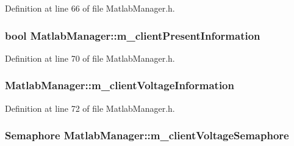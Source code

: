 Definition at line 66 of file Matlab\-Manager.\-h.

\hypertarget{class_matlab_manager_acf28415517fd10ff8105e5ac80280a63}{
\subsubsection[{m\-\_\-client\-Present\-Information}]{\setlength{\rightskip}{0pt plus 5cm}bool Matlab\-Manager\-::m\-\_\-client\-Present\-Information\hspace{0.3cm}{\ttfamily [private]}}}\label{class_matlab_manager_acf28415517fd10ff8105e5ac80280a63}


Definition at line 70 of file Matlab\-Manager.\-h.

\hypertarget{class_matlab_manager_abf48a413742f5d98d4a13c68b60d9e83}{
\subsubsection[{m\-\_\-client\-Voltage\-Information}]{ Matlab\-Manager\-::m\-\_\-client\-Voltage\-Information\hspace{0.3cm}{\ttfamily [private]}}}\label{class_matlab_manager_abf48a413742f5d98d4a13c68b60d9e83}


Definition at line 72 of file Matlab\-Manager.\-h.

\hypertarget{class_matlab_manager_a18a1ab2e178279313daf7a0790b91f04}{
\subsubsection[{m\-\_\-client\-Voltage\-Semaphore}]{\setlength{\rightskip}{0pt plus 5cm}Semaphore Matlab\-Manager\-::m\-\_\-client\-Voltage\-Semaphore\hspace{0.3cm}{\ttfamily [private]}}}\label{class_matlab_manager_a18a1ab2e178279313daf7a0790b91f04}


